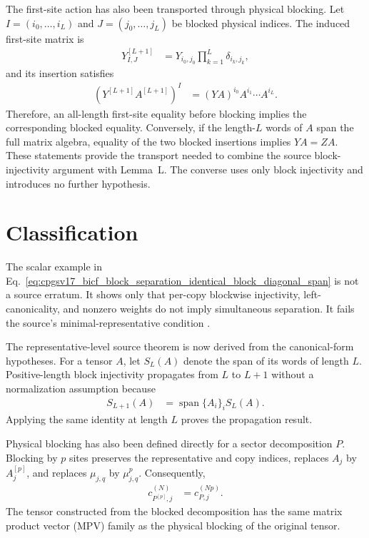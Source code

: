 \documentclass{article}
\begin{document}
The first-site action has also been transported through physical blocking.
Let $I=(i_0,\ldots,i_L)$ and $J=(j_0,\ldots,j_L)$ be blocked physical indices.
The induced first-site matrix is
\begin{align}
    Y^{[L+1]}_{I,J}
        &=Y_{i_0,j_0}
          \prod_{k=1}^{L}\delta_{i_k,j_k},
    \label{eq:cpgsv17_bicf_block_separation_blocked_first_site_matrix}
\end{align}
and its insertion satisfies
\begin{align}
    \left(Y^{[L+1]}A^{[L+1]}\right)^I
        &=(YA)^{i_0}A^{i_1}\cdots A^{i_L}.
    \label{eq:cpgsv17_bicf_block_separation_blocked_insertion}
\end{align}
Therefore, an all-length first-site equality before blocking implies the
corresponding blocked equality. Conversely, if the length-$L$ words of $A$
span the full matrix algebra, equality of the two blocked insertions implies
$YA=ZA$. These statements provide the transport needed to combine the source
block-injectivity argument with Lemma~L. The converse uses only block
injectivity and introduces no further hypothesis.

\section{Classification}

The scalar example in
Eq.~\ref{eq:cpgsv17_bicf_block_separation_identical_block_diagonal_span} is
not a source erratum. It shows only that per-copy blockwise injectivity,
left-canonicality, and nonzero weights do not imply simultaneous separation.
It fails the source's minimal-representative condition
\cite{Cirac2016MPDO_arXiv}.

The representative-level source theorem is now derived from the canonical-form
hypotheses. For a tensor $A$, let $S_L(A)$ denote the span of its words of
length $L$. Positive-length block injectivity propagates from $L$ to $L+1$
without a normalization assumption because
\begin{align}
    S_{L+1}(A)
        &= \operatorname{span}\{A_i\}_i S_L(A).
    \label{eq:cpgsv17_bicf_block_separation_word_span_propagation}
\end{align}
Applying the same identity at length $L$ proves the propagation result.

Physical blocking has also been defined directly for a sector decomposition
$P$. Blocking by $p$ sites preserves the representative and copy indices,
replaces $A_j$ by $A_j^{[p]}$, and replaces $\mu_{j,q}$ by $\mu_{j,q}^p$.
Consequently,
\begin{align}
    c_{P^{[p]},j}^{(N)}
        &= c_{P,j}^{(Np)}.
    \label{eq:cpgsv17_bicf_block_separation_blocked_power_sum}
\end{align}
The tensor constructed from the blocked decomposition has the same matrix
product vector (MPV) family as the physical blocking of the original tensor.
\end{document}
